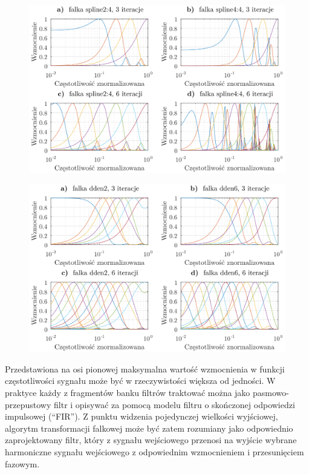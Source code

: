 \begin{figure}[htb!]
\begin{center}
\includegraphics{obrazki/bank_spline_demo}
\end{center}
\end{figure}

\begin{figure}[htb!]
\begin{center}
\includegraphics{obrazki/bank_dden_demo}
\end{center}
\end{figure}

Przedstawiona na osi pionowej maksymalna wartość wzmocnienia w funkcji częstotliwości sygnału może być w rzeczywistości większa od jedności. W praktyce każdy z fragmentów banku filtrów traktować można jako pasmowo-przepustowy filtr i opisywać za pomocą modelu filtru o skończonej odpowiedzi impulsowej (\enquote{FIR}). Z punktu widzenia pojedynczej wielkości wyjściowej, algorytm transformacji falkowej może być zatem rozumiany jako odpowiednio zaprojektowany filtr, który z sygnału wejściowego przenosi na wyjście wybrane harmoniczne sygnału wejściowego z odpowiednim wzmocnieniem i przesunięciem fazowym.

